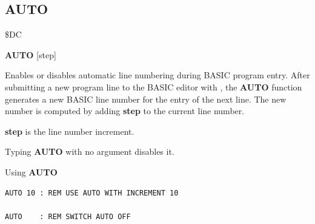 \subsection{AUTO}
\begin{description}[leftmargin=2cm,style=nextline]
\item [Token:]    \$DC

\item [Format:]   {\bf AUTO} [step]

\item [Usage:]    Enables or disables automatic line numbering during BASIC program entry. After submitting a new program line to the BASIC editor with , the {\bf AUTO} function generates a new BASIC line number for the entry of the next line. The new number is computed by adding {\bf step} to the current line number.

                  {\bf step} is the line number increment.

                  Typing {\bf AUTO} with no argument disables it.

\item [Examples:] Using {\bf AUTO}

\begin{tcolorbox}[colback=black,coltext=white]
\verbatimfont{\codefont}
\begin{verbatim}
AUTO 10 : REM USE AUTO WITH INCREMENT 10

AUTO    : REM SWITCH AUTO OFF
\end{verbatim}
\end{tcolorbox}
\end{description}


\newpage
